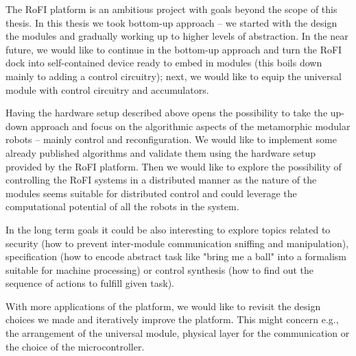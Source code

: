 The RoFI platform is an ambitious project with goals beyond the scope of this
thesis. In this thesis we took bottom-up approach -- we started with the design
the modules and gradually working up to higher levels of abstraction. In the
near future, we would like to continue in the bottom-up approach and turn the
RoFI dock into self-contained device ready to embed in modules (this boils down
mainly to adding a control circuitry); next, we would like to equip the
universal module with control circuitry and accumulators.

Having the hardware setup described above opens the possibility to take the
up-down approach and focus on the algorithmic aspects of the metamorphic modular
robots -- mainly control and reconfiguration. We would like to implement some
already published algorithms and validate them using the hardware setup provided
by the RoFI platform. Then we would like to explore the possibility of
controlling the RoFI systems in a distributed manner as the nature of the
modules seems suitable for distributed control and could leverage the
computational potential of all the robots in the system.

In the long term goals it could be also interesting to explore topics related to
security (how to prevent inter-module communication sniffing and manipulation),
specification (how to encode abstract task like "bring me a ball" into a
formalism suitable for machine processing) or control synthesis (how to find out
the sequence of actions to fulfill given task).

With more applications of the platform, we would like to revisit the design
choices we made and iteratively improve the platform. This might concern e.g.,
the arrangement of the universal module, physical layer for the communication or
the choice of the microcontroller.